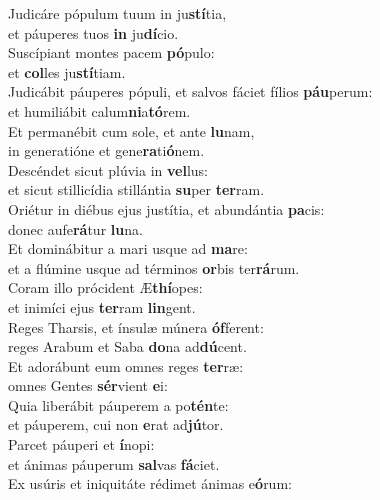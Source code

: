 \evenverse Judicáre pópulum tuum in ju\textbf{stí}tia,~\*\\
\evenverse et páuperes tuos \textbf{in} ju\textbf{dí}cio.\\
\oddverse Suscípiant montes pacem \textbf{pó}pulo:~\*\\
\oddverse et \textbf{col}les ju\textbf{stí}tiam.\\
\evenverse Judicábit páuperes pópuli, et salvos fáciet fílios \textbf{páu}perum:~\*\\
\evenverse et humiliábit calum\textbf{ni}a\textbf{tó}rem.\\
\oddverse Et permanébit cum sole, et ante \textbf{lu}nam,~\*\\
\oddverse in generatióne et gene\textbf{ra}ti\textbf{ó}nem.\\
\evenverse Descéndet sicut plúvia in \textbf{vel}lus:~\*\\
\evenverse et sicut stillicídia stillántia \textbf{su}per \textbf{ter}ram.\\
\oddverse Oriétur in diébus ejus justítia, et abundántia \textbf{pa}cis:~\*\\
\oddverse donec aufe\textbf{rá}tur \textbf{lu}na.\\
\evenverse Et dominábitur a mari usque ad \textbf{ma}re:~\*\\
\evenverse et a flúmine usque ad términos \textbf{or}bis ter\textbf{rá}rum.\\
\oddverse Coram illo prócident Æ\textbf{thí}opes:~\*\\
\oddverse et inimíci ejus \textbf{ter}ram \textbf{lin}gent.\\
\evenverse Reges Tharsis, et ínsulæ múnera \textbf{óf}ferent:~\*\\
\evenverse reges Arabum et Saba \textbf{do}na ad\textbf{dú}cent.\\
\oddverse Et adorábunt eum omnes reges \textbf{ter}ræ:~\*\\
\oddverse omnes Gentes \textbf{sér}vient \textbf{e}i:\\
\evenverse Quia liberábit páuperem a po\textbf{tén}te:~\*\\
\evenverse et páuperem, cui non \textbf{e}rat ad\textbf{jú}tor.\\
\oddverse Parcet páuperi et \textbf{í}nopi:~\*\\
\oddverse et ánimas páuperum \textbf{sal}vas \textbf{fá}ciet.\\
\evenverse Ex usúris et iniquitáte rédimet ánimas e\textbf{ó}rum:~\*\\
